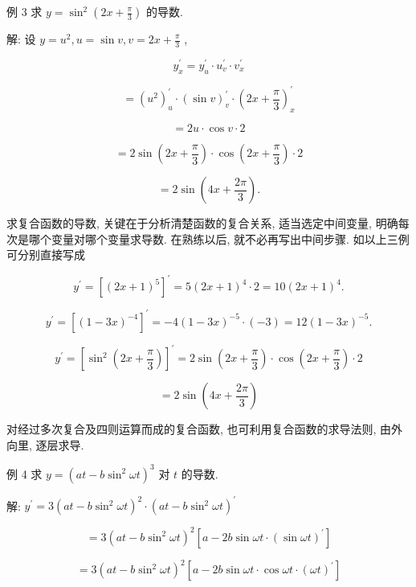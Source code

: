 \documentclass[10pt]{article}
\begin{document}
例 3 求 \(y = {\sin }^{2}\left( {{2x} + \frac{\pi }{3}}\right)\) 的导数.

解: 设 \(y = {u}^{2},u = \sin v,v = {2x} + \frac{\pi }{3}\) ,

\[
{y}_{x}^{\prime } = {y}_{u}^{\prime } \cdot {u}_{v}^{\prime } \cdot {v}_{x}^{\prime }
\]

\[
= {\left( {u}^{2}\right) }_{u}^{\prime } \cdot {\left( \sin v\right) }_{v}^{\prime } \cdot {\left( 2x + \frac{\pi }{3}\right) }_{x}^{\prime }
\]

\[
= {2u} \cdot \cos v \cdot 2
\]

\[
= 2\sin \left( {{2x} + \frac{\pi }{3}}\right) \cdot \cos \left( {{2x} + \frac{\pi }{3}}\right) \cdot 2
\]

\[
= 2\sin \left( {{4x} + \frac{2\pi }{3}}\right) \text{.}
\]

求复合函数的导数, 关键在于分析清楚函数的复合关系, 适当选定中间变量, 明确每次是哪个变量对哪个变量求导数. 在熟练以后, 就不必再写出中间步骤. 如以上三例可分别直接写成

\[
{y}^{\prime } = {\left\lbrack {\left( 2x + 1\right) }^{5}\right\rbrack }^{\prime } = 5{\left( 2x + 1\right) }^{4} \cdot 2 = {10}{\left( 2x + 1\right) }^{4}.
\]

\[
{y}^{\prime } = {\left\lbrack {\left( 1 - 3x\right) }^{-4}\right\rbrack }^{\prime } = - 4{\left( 1 - 3x\right) }^{-5} \cdot \left( {-3}\right) = {12}{\left( 1 - 3x\right) }^{-5}.
\]

\[
{y}^{\prime } = {\left\lbrack {\sin }^{2}\left( 2x + \frac{\pi }{3}\right) \right\rbrack }^{\prime } = 2\sin \left( {{2x} + \frac{\pi }{3}}\right) \cdot \cos \left( {{2x} + \frac{\pi }{3}}\right) \cdot 2
\]

\[
= 2\sin \left( {{4x} + \frac{2\pi }{3}}\right)
\]

对经过多次复合及四则运算而成的复合函数, 也可利用复合函数的求导法则, 由外向里, 逐层求导.

例 4 求 \(y = {\left( at - b{\sin }^{2}\omega t\right) }^{3}\) 对 \(t\) 的导数.

解: \({y}^{\prime } = 3{\left( at - b{\sin }^{2}\omega t\right) }^{2} \cdot {\left( at - b{\sin }^{2}\omega t\right) }^{\prime }\)

\[
= 3{\left( at - b{\sin }^{2}\omega t\right) }^{2}\left\lbrack {a - {2b}\sin {\omega t} \cdot {\left( \sin \omega t\right) }^{\prime }}\right\rbrack
\]

\[
= 3{\left( at - b{\sin }^{2}\omega t\right) }^{2}\left\lbrack {a - {2b}\sin {\omega t} \cdot \cos {\omega t} \cdot {\left( \omega t\right) }^{\prime }}\right\rbrack
\]
\end{document}
